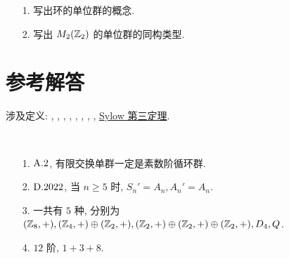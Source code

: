 \problem[题目 7]
\begin{itemize}
	\item[1.] 写出环的单位群的概念.
	\item[2.] 写出 $M_2(\mathbb Z_2)$ 的单位群的同构类型.
\end{itemize}

\newpage

\section*{参考解答}

涉及定义: , , , , , , , , \hyperref[Sylow3]{Sylow 第三定理}.

\problem[题目 1]

\begin{solution}\

	\begin{itemize}
		\item[1.] $\text {A}.2$, 有限交换单群一定是素数阶循环群.

		\item[2.] $\text {D}.2022$, 当 $n\geqslant 5$ 时, $S_n'=A_n,A_n'=A_n$.

		\item[3.] 一共有 $5$ 种, 分别为 $(\mathbb Z_8,+),(\mathbb Z_4,+)\oplus(\mathbb Z_2,+),(\mathbb Z_2,+)\oplus(\mathbb Z_2,+)\oplus(\mathbb Z_2,+),D_4,Q$.

		\item[4.] $12$ 阶, $1+3+8$.
	\end{itemize}
\end{solution}

\problem[题目 2]

